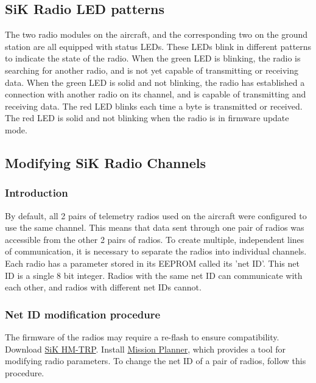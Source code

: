 \documentclass[12pt,journal,compsoc]{IEEEtran}
\begin{document}
\subsection{SiK Radio LED patterns}
The two radio modules on the aircraft, and the corresponding two on the ground station are all equipped with status LEDs. These LEDs blink in different patterns to indicate the state of the radio. When the green LED is blinking, the radio is searching for another radio, and is not yet capable of transmitting or receiving data. When the green LED is solid and not blinking, the radio has established a connection with another radio on its channel, and is capable of transmitting and receiving data. The red LED blinks each time a byte is transmitted or received. The red LED is solid and not blinking when the radio is in firmware update mode.   

\subsection{Modifying SiK Radio Channels}
\subsubsection{Introduction}
By default, all 2 pairs of telemetry radios used on the aircraft were configured to use the same channel. This means that data sent through one pair of radios was accessible from the other 2 pairs of radios. To create multiple, independent lines of communication, it is necessary to separate the radios into individual channels. Each radio has a parameter stored in its EEPROM called its 'net ID'. This net ID is a single 8 bit integer. Radios with the same net ID can communicate with each other, and radios with different net IDs cannot.    
\subsubsection{Net ID modification procedure}
The firmware of the radios may require a re-flash to ensure compatibility. Download 
\href{https://drive.google.com/open?id=17GBNzsjTxYfQuoexLm5VmItGezQfW7dR}{SiK HM-TRP}. Install \href{http://ardupilot.org/planner/}{Mission Planner}, which provides a tool for modifying radio parameters. To change the net ID of a pair of radios, follow this procedure.
\end{document}
